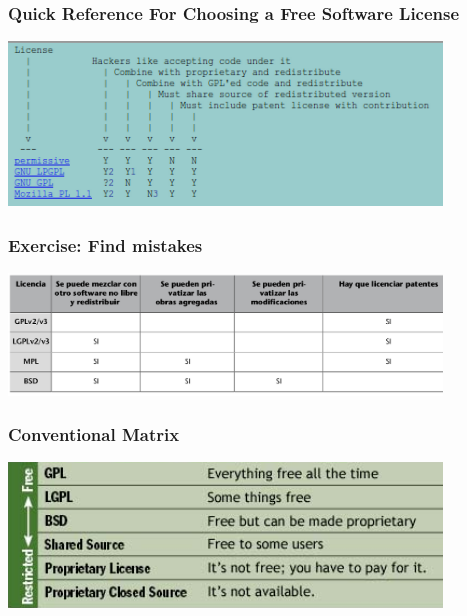 \begin{frame}
\frametitle{Quick Reference For Choosing a Free Software License}

\begin{center}
\includegraphics[width=11.5cm]{figs/licenses_quick_reference.png}
\end{center}

\end{frame}


\begin{frame}
\frametitle{Exercise: Find mistakes}

\begin{center}
\includegraphics[width=11.5cm]{figs/tabla_licencias.png}
\end{center}

\end{frame}


\begin{frame}
\frametitle{Conventional Matrix}

\begin{center}
\includegraphics[width=11.5cm]{figs/conventional_matrix.png}
\end{center}

\end{frame}

